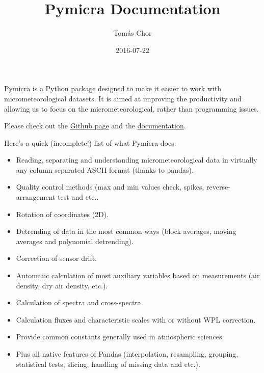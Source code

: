 \documentclass[a4paper,10pt,oneside]{sphinxmanual}
\title{Pymicra Documentation}
\date{2016-07-22}
\author{Tomás Chor}
\begin{document}
\maketitle
\tableofcontents
{}\label{index::doc}


Pymicra is a Python package designed to make it easier to work with
micrometeorological datasets. It is aimed at improving the productivity and
allowing us to focus on the micrometeorological, rather than programming
issues.

Please check out the \href{https://github.com/tomchor/pymicra}{Github page} and the
\href{http://tomchor.github.io/pymicra/}{documentation}.

Here's a quick (incomplete!) list of what Pymicra does:
\begin{itemize}
\item {} 
Reading, separating and understanding micrometeorological data in
virtually any column-separated ASCII format (thanks to pandas).

\item {} 
Quality control methods (max and min values check, spikes,
reverse-arrangement test and etc..

\item {} 
Rotation of coordinates (2D).

\item {} 
Detrending of data in the most common ways (block averages, moving
averages and polynomial detrending).

\item {} 
Correction of sensor drift.

\item {} 
Automatic calculation of most auxiliary variables based on
measurements (air density, dry air density, etc.).

\item {} 
Calculation of spectra and cross-spectra.

\item {} 
Calculation fluxes and characteristic scales with or without WPL correction.

\item {} 
Provide common constants generally used in atmospheric sciences.

\item {} 
Plus all native features of Pandas (interpolation, resampling,
grouping, statistical tests, slicing, handling of missing data and
etc.).

\end{itemize}
\end{document}
